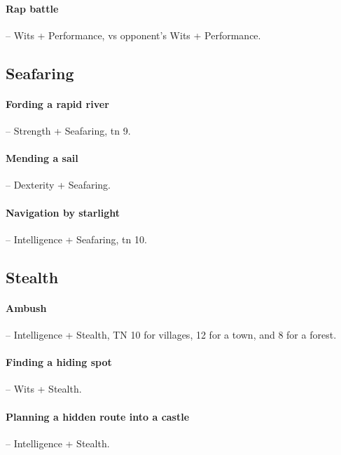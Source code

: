 \begin{multicols}{2}
\paragraph{Rap battle} -- Wits + Performance, vs opponent's Wits + Performance.

\subsection{Seafaring}

\paragraph{Fording a rapid river} -- Strength + Seafaring, \gls{tn} 9.

\paragraph{Mending a sail} -- Dexterity + Seafaring.

\paragraph{Navigation by starlight} -- Intelligence + Seafaring, \gls{tn} 10.

\subsection{Stealth}

\paragraph{Ambush} -- Intelligence + Stealth, TN 10 for villages, 12 for a town, and 8 for a forest.

\paragraph{Finding a hiding spot} -- Wits + Stealth.

\paragraph{Planning a hidden route into a castle} -- Intelligence + Stealth.

\begin{figure*}[t]


\end{figure*}
\end{multicols}
